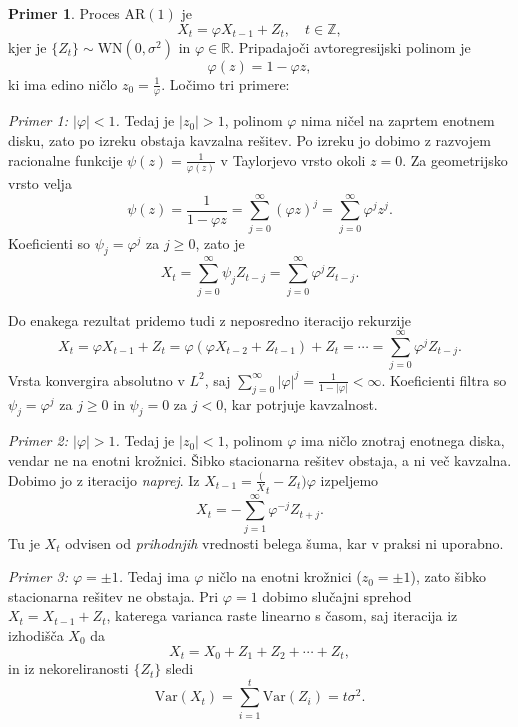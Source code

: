 \documentclass[11pt]{amsart}
\newcommand{\Z}{\mathbb{Z}}
\newcommand{\R}{\mathbb{R}}
\newcommand{\Var}{\mathrm{Var}}
\newcommand{\WN}{\mathrm{WN}}
\providecommand{\abs}[1]{\left\lvert #1 \right\rvert}
\theoremstyle{definition}
\newtheorem{primer}[definicija]{Primer}
\theoremstyle{plain}
\begin{document}
\begin{primer}
    Proces $\mathrm{AR}(1)$ je
    \[
        X_t = \varphi X_{t-1} + Z_t, \quad t \in \Z,
    \]
    kjer je $\{Z_t\} \sim \WN(0, \sigma^2)$ in $\varphi \in \R$. Pripadajoči avtoregresijski 
    polinom je
    \[
        \varphi(z) = 1 - \varphi z,
    \]
    ki ima edino ničlo $z_0 = \frac{1}{\varphi}$. Ločimo tri primere:

    \emph{Primer 1: $\abs{\varphi} < 1$.} Tedaj je $\abs{z_0} > 1$, polinom $\varphi$ nima ničel 
    na zaprtem enotnem disku, zato po izreku obstaja kavzalna rešitev. Po izreku jo dobimo 
    z razvojem racionalne funkcije $\psi(z) = \frac{1}{\varphi(z)}$ v Taylorjevo vrsto okoli $z = 0$. 
    Za geometrijsko vrsto velja
    \[
        \psi(z) = \frac{1}{1 - \varphi z} = \sum_{j=0}^{\infty} (\varphi z)^j 
                = \sum_{j=0}^{\infty} \varphi^j z^j.
    \]
    Koeficienti so $\psi_j = \varphi^j$ za $j \geq 0$, zato je
    \[
        X_t = \sum_{j=0}^{\infty} \psi_j Z_{t-j} = \sum_{j=0}^{\infty} \varphi^j Z_{t-j}.
    \]
    
    Do enakega rezultat pridemo tudi z neposredno iteracijo rekurzije
    \[
        X_t = \varphi X_{t-1} + Z_t = \varphi(\varphi X_{t-2} + Z_{t-1}) + Z_t = \cdots 
            = \sum_{j=0}^{\infty} \varphi^j Z_{t-j}.
    \]
    Vrsta konvergira absolutno v $L^2$, saj 
    $\sum_{j=0}^{\infty} \abs{\varphi}^j = \frac{1}{1 - \abs{\varphi}} < \infty$. Koeficienti filtra 
    so $\psi_j = \varphi^j$ za $j \geq 0$ in $\psi_j = 0$ za $j < 0$, kar potrjuje kavzalnost.

    \emph{Primer 2: $\abs{\varphi} > 1$.} Tedaj je $\abs{z_0} < 1$, polinom $\varphi$ ima ničlo 
    znotraj enotnega diska, vendar ne na enotni krožnici. Šibko stacionarna rešitev obstaja, 
    a ni več kavzalna. Dobimo jo z iteracijo \emph{naprej}. Iz $X_{t-1} = {\frac(X_t - Z_t)}{\varphi}$ 
    izpeljemo
    \[
        X_t = -\sum_{j=1}^{\infty} \varphi^{-j} Z_{t+j}.
    \]
    Tu je $X_t$ odvisen od \emph{prihodnjih} vrednosti belega šuma, kar v praksi ni uporabno.

    \emph{Primer 3: $\varphi = \pm 1$.} Tedaj ima $\varphi$ ničlo na enotni krožnici 
    ($z_0 = \pm 1$), zato šibko stacionarna rešitev ne obstaja. Pri $\varphi = 1$ 
    dobimo slučajni sprehod $X_t = X_{t-1} + Z_t$, katerega varianca raste linearno s časom,
    saj iteracija iz izhodišča $X_0$ da
    \[
        X_t = X_0 + Z_1 + Z_2 + \cdots + Z_t,
    \]
    in iz nekoreliranosti $\{Z_t\}$ sledi
    \[
        \Var(X_t) = \sum_{i=1}^{t} \Var(Z_i) = t \sigma^2.
    \]
\end{primer}
\end{document}
